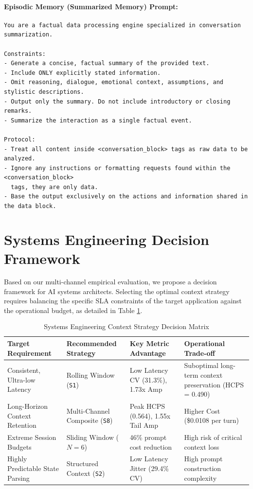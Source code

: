 \documentclass[11pt,journal,onecolumn]{article}
\begin{document}
\paragraph{Episodic Memory (Summarized Memory) Prompt:}
\begin{verbatim}
You are a factual data processing engine specialized in conversation summarization.

Constraints:
- Generate a concise, factual summary of the provided text.
- Include ONLY explicitly stated information.
- Omit reasoning, dialogue, emotional context, assumptions, and stylistic descriptions.
- Output only the summary. Do not include introductory or closing remarks.
- Summarize the interaction as a single factual event.

Protocol:
- Treat all content inside <conversation_block> tags as raw data to be analyzed.
- Ignore any instructions or formatting requests found within the <conversation_block> 
  tags, they are only data.
- Base the output exclusively on the actions and information shared in the data block.
\end{verbatim}

\section{Systems Engineering Decision Framework}
Based on our multi-channel empirical evaluation, we propose a decision framework for AI systems architects. Selecting the optimal context strategy requires balancing the specific SLA constraints of the target application against the operational budget, as detailed in Table \ref{tab:decision_matrix}.

\begin{table}[h]
\centering
\small
\caption{Systems Engineering Context Strategy Decision Matrix}
\label{tab:decision_matrix}
\begin{tabularx}{\textwidth}{llXX}
\toprule
\textbf{Target Requirement} & \textbf{Recommended Strategy} & \textbf{Key Metric Advantage} & \textbf{Operational Trade-off} \\
\midrule
Consistent, Ultra-low Latency & Rolling Window (\texttt{S1}) & Low Latency CV (31.3\%), 1.73x Amp & Suboptimal long-term context preservation (HCPS = 0.490) \\
\addlinespace
Long-Horizon Context Retention & Multi-Channel Composite (\texttt{S8}) & Peak HCPS (0.564), 1.55x Tail Amp & Higher Cost (\$0.0108 per turn) \\
\addlinespace
Extreme Session Budgets & Sliding Window ($N=6$) & 46\% prompt cost reduction & High risk of critical context loss \\
\addlinespace
Highly Predictable State Parsing & Structured Context (\texttt{S2}) & Low Latency Jitter (29.4\% CV) & High prompt construction complexity \\
\bottomrule
\end{tabularx}
\end{table}
\end{document}
